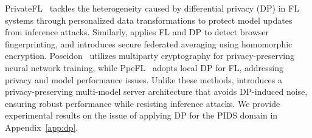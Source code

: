  PrivateFL~\cite{yang2023privatefl} tackles the heterogeneity caused by differential privacy (DP) in FL systems through personalized data transformations to protect model updates from inference attacks. Similarly, \cite{annamalai2023fp} applies FL and DP to detect browser fingerprinting, and \cite{dasu2022prov} introduces secure federated averaging using homomorphic encryption. Poseidon~\cite{sav2020poseidon} utilizes multiparty cryptography for privacy-preserving neural network training, while PpeFL~\cite{wang2023ppefl} adopts local DP for FL, addressing privacy and model performance issues. Unlike these methods, \Sys introduces a privacy-preserving multi-model server architecture that avoids DP-induced noise, ensuring robust performance while resisting inference attacks. We provide experimental results on the issue of applying DP for the PIDS domain in Appendix~\ref{app:dp}.











